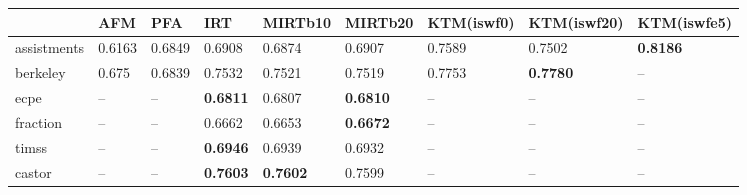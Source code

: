 \begin{tabular}{lllllllll}
\toprule
{} &     AFM &     PFA &              IRT &          MIRTb10 &          MIRTb20 & KTM(iswf0) &      KTM(iswf20) & KTM(iswfe5) \\
\midrule
assistments         &  0.6163 &  0.6849 &           0.6908 &           0.6874 &           0.6907 &     0.7589 &           0.7502 &          \textbf{0.8186} \\
berkeley            &   0.675 &  0.6839 &           0.7532 &           0.7521 &           0.7519 &     0.7753 &  \textbf{0.7780} &          -- \\
ecpe                &      -- &      -- &  \textbf{0.6811} &           0.6807 &  \textbf{0.6810} &         -- &               -- &          -- \\
fraction            &      -- &      -- &           0.6662 &           0.6653 &  \textbf{0.6672} &         -- &               -- &          -- \\
timss           &      -- &      -- &  \textbf{0.6946} &           0.6939 &           0.6932 &         -- &               -- &          -- \\
castor            &      -- &      -- &  \textbf{0.7603} &  \textbf{0.7602} &           0.7599 &         -- &               -- &          -- \\
\bottomrule
\end{tabular}
